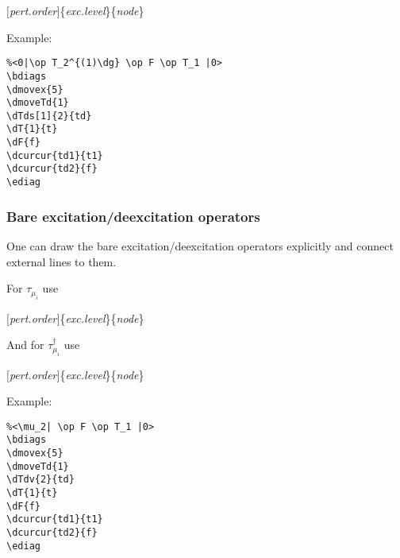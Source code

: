 \documentclass[a4paper]{article}
\newcommand{\myind}{\hspace{10pt}}
\begin{document}
\myind{\bf \textbackslash dTds}$[${\it pert.order}$]$\{{\it exc.level}\}\{{\it node}\}

Example:

\begin{table}[ht]
 \begin{minipage}[b]{0.5\linewidth}\centering
  \begin{lstlisting}
%<0|\op T_2^{(1)\dg} \op F \op T_1 |0>
\bdiags
\dmovex{5}
\dmoveTd{1}
\dTds[1]{2}{td}
\dT{1}{t}
\dF{f}
\dcurcur{td1}{t1}
\dcurcur{td2}{f}
\ediag
  \end{lstlisting}
 \end{minipage}
 \begin{minipage}[b]{0.5\linewidth}\centering
\bdiags
{}
\ediag
 \end{minipage}
\end{table}

\subsubsection{Bare excitation/deexcitation operators}

One can draw the bare excitation/deexcitation operators explicitly and connect external lines to them.

For $\tau_{\mu_i}$ use

\myind{\bf \textbackslash dTv}$[${\it pert.order}$]$\{{\it exc.level}\}\{{\it node}\}

And for $\tau^{\dagger}_{\mu_i}$ use

\myind{\bf \textbackslash dTdv}$[${\it pert.order}$]$\{{\it exc.level}\}\{{\it node}\}

Example:
\begin{table}[ht]
 \begin{minipage}[b]{0.5\linewidth}\centering
  \begin{lstlisting}
%<\mu_2| \op F \op T_1 |0>
\bdiags
\dmovex{5}
\dmoveTd{1}
\dTdv{2}{td}
\dT{1}{t}
\dF{f}
\dcurcur{td1}{t1}
\dcurcur{td2}{f}
\ediag
  \end{lstlisting}
 \end{minipage}
 \begin{minipage}[b]{0.5\linewidth}\centering
\bdiags
{}
\ediag
 \end{minipage}
\end{table}
\end{document}
